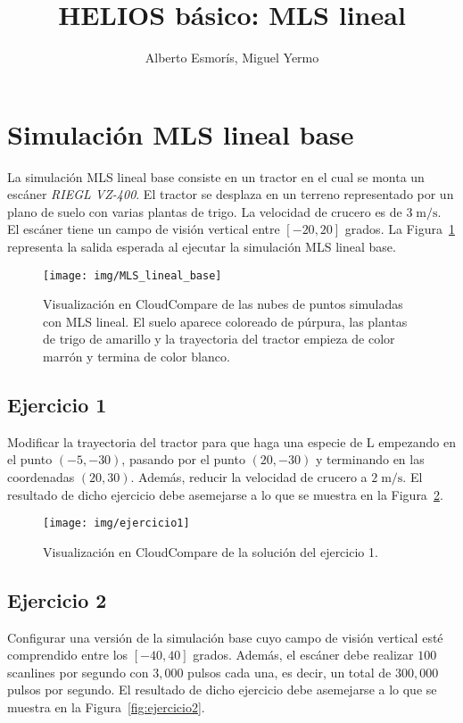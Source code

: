 \documentclass[]{article}
\title{HELIOS básico: MLS lineal}
\author{Alberto Esmorís, Miguel Yermo}
\date{}
\begin{document}
	
	\maketitle
	
	
	
	\section*{Simulación MLS lineal base}
	La simulación MLS lineal base consiste en un tractor en el cual se monta un escáner \textit{RIEGL VZ-400}. El tractor se desplaza en un terreno representado por un plano de suelo con varias plantas de trigo. La velocidad de crucero es de $3\;\text{m}/\text{s}$. El escáner tiene un campo de visión vertical entre $[-20, 20]$ grados. La Figura~\ref{fig:mls_lineal_base} representa la salida esperada al ejecutar la simulación MLS lineal base.
	
	\begin{figure}[htb]
		\centering
		\texttt{[image: img/MLS\_lineal\_base]}
		\caption{Visualización en CloudCompare de las nubes de puntos simuladas con MLS lineal. El suelo aparece coloreado de púrpura, las plantas de trigo de amarillo y la trayectoria del tractor empieza de color marrón y termina de color blanco.}
		\label{fig:mls_lineal_base}
	\end{figure}


	\pagebreak
	

	\subsection*{Ejercicio 1}
	Modificar la trayectoria del tractor para que haga una especie de L empezando en el punto $(-5, -30)$, pasando por el punto $(20, -30)$ y terminando en las coordenadas $(20, 30)$. Además, reducir la velocidad de crucero a $2\;\text{m}/\text{s}$. El resultado de dicho ejercicio debe asemejarse a lo que se muestra en la Figura~\ref{fig:ejercicio1}.
	
	\begin{figure}[htb]
		\centering
		\texttt{[image: img/ejercicio1]}
		\caption{Visualización en CloudCompare de la solución del ejercicio 1.}
		\label{fig:ejercicio1}
	\end{figure}


	\subsection*{Ejercicio 2}
	Configurar una versión de la simulación base cuyo campo de visión vertical esté comprendido entre los $[-40, 40]$ grados. Además, el escáner debe realizar $100$ scanlines por segundo con $3,000$ pulsos cada una, es decir, un total de $300,000$ pulsos por segundo. El resultado de dicho ejercicio debe asemejarse a lo que se muestra en la Figura~\ref{fig:ejercicio2}.
	
\end{document}
